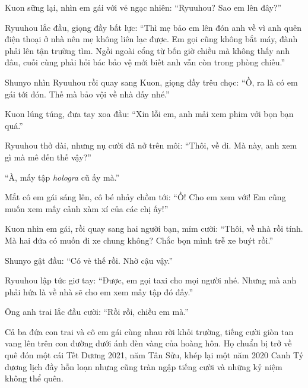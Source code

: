 \documentclass[../main.tex]{subfiles}
\begin{document}
Kuon sững lại, nhìn em gái với vẻ ngạc nhiên: ``Ryuuhou? Sao em lên đây?''

Ryuuhou lắc đầu, giọng đầy bất lực: ``Thì mẹ bảo em lên đón anh về vì anh quên điện thoại ở nhà nên mẹ không liên lạc được. Em gọi cũng không bắt máy, đành phải lên tận trường tìm. Ngồi ngoài cổng từ bốn giờ chiều mà không thấy anh đâu, cuối cùng phải hỏi bác bảo vệ mới biết anh vẫn còn trong phòng chiếu.''

Shunyo nhìn Ryuuhou rồi quay sang Kuon, giọng đầy trêu chọc: ``Ồ, ra là có em gái tới đón. Thế mà bảo vội về nhà đấy nhé.''

Kuon lúng túng, đưa tay xoa đầu: ``Xin lỗi em, anh mải xem phim với bọn bạn quá.''

Ryuuhou thở dài, nhưng nụ cười đã nở trên môi: ``Thôi, về đi. Mà này, anh xem gì mà mê đến thế vậy?''

``À, mấy tập \textit{hologra} cũ ấy mà.''

Mắt cô em gái sáng lên, cô bé nhảy chồm tới: ``Ồ! Cho em xem với! Em cũng muốn xem mấy cảnh xàm xí của các chị ấy!''

Kuon nhìn em gái, rồi quay sang hai người bạn, mỉm cười: ``Thôi, về nhà rồi tính. Mà hai đứa có muốn đi xe chung không? Chắc bọn mình trễ xe buýt rồi.''

Shunyo gật đầu: ``Có vẻ thế rồi. Nhờ cậu vậy.''

Ryuuhou lập tức giơ tay: ``Được, em gọi taxi cho mọi người nhé. Nhưng mà anh phải hứa là về nhà sẽ cho em xem mấy tập đó đấy.''

Ông anh trai lắc đầu cười: ``Rồi rồi, chiều em mà.''

Cả ba đứa con trai và cô em gái cùng nhau rời khỏi trường, tiếng cười giòn tan vang lên trên con đường dưới ánh đèn vàng của hoàng hôn. Họ chuẩn bị trở về quê đón một cái Tết Dương 2021, năm Tân Sửu, khép lại một năm 2020 Canh Tý dương lịch đầy hỗn loạn nhưng cũng tràn ngập tiếng cười và những kỷ niệm không thể quên.
\end{document}
